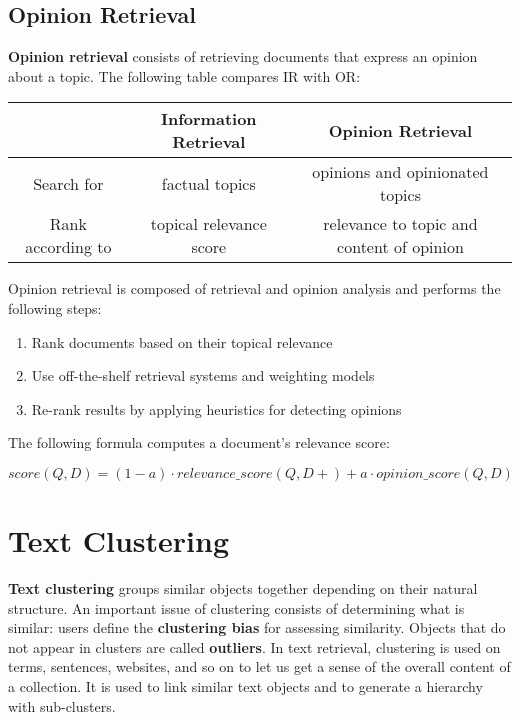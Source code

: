 \documentclass{article}
\begin{document}
\subsection{Opinion Retrieval}
\textbf{Opinion retrieval} consists of retrieving documents that express an opinion about a topic. The following table compares IR with OR:
\begin{center}
    \begin{table}[H]
        \begin{tabular}{c|c|c}
                              & Information Retrieval   & Opinion Retrieval                         \\ \hline
            Search for        & factual topics          & opinions and opinionated topics           \\ \hline
            Rank according to & topical relevance score & relevance to topic and content of opinion
        \end{tabular}
    \end{table}
\end{center}
Opinion retrieval is composed of retrieval and opinion analysis and performs the following steps:
\begin{enumerate}
    \item Rank documents based on their topical relevance
    \item Use off-the-shelf retrieval systems and weighting models
    \item Re-rank results by applying heuristics for detecting opinions
\end{enumerate}
The following formula computes a document's relevance score:
\begin{center}
    $score(Q, D) = (1 - a) \cdot relevance\_score(Q,D+) + a \cdot opinion\_score(Q,D)$
\end{center}

\newpage

\section{Text Clustering}
\textbf{Text clustering} groups similar objects together depending on their natural structure. An important issue of clustering consists of determining what is similar: users define the \textbf{clustering bias} for assessing similarity. Objects that do not appear in clusters are called \textbf{outliers}.
In text retrieval, clustering is used on terms, sentences, websites, and so on to let us get a sense of the overall content of a collection.
It is used to link similar text objects and to generate a hierarchy with sub-clusters.
\end{document}
